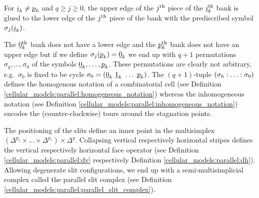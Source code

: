 For $\underline{\smash{i}}_k \neq \underline{\smash{p}}_k$ and $q \ge j \ge 0$,
the upper edge of the $j^{\text{th}}$ piece of the $\underline{\smash{i}}_k^{\text{th}}$ bank is glued to the lower edge of the $j^{\text{th}}$ piece of the bank with the prediscribed symbol $\sigma_j(\underline{\smash{i}}_k)$.

The $\underline{\smash{0}}_k^{\text{th}}$ bank does not have a lower edge and the $\underline{\smash{p}}_k^{\text{th}}$ bank does not have an upper edge but if we define $\sigma_j(\underline{\smash{p}}_k) = \underline{\smash{0}}_k$
we end up with $q+1$ permutations $\sigma_q, \ldots, \sigma_0$ of the symbols $\ul 0_k, \ldots, \ul p_k$.
These permutations are clearly not arbitrary, e.g.\ 
$\sigma_0$ is fixed to be cycle $\sigma_0 = (\ul 0_k\ \ul 1_k\ \ldots\ \ul p_k)$.
The $(q+1)$-tuple $\homog$ defines the homogenous notation of a combinatorial cell (see Definition \ref{cellular_models:parallel:homogeneous_notation})
whereas the inhomogeneous notation (see Definition \ref{cellular_models:parallel:inhomogeneous_notation})
encodes the (counter-clockwise) tours around the stagnation points.

The positioning of the slits define an inner point in the multisimplex $(\Delta^{p_1} \times \ldots \times \Delta^{p_r}) \times \Delta^q$.
Collapsing vertical respectively horizontal stripes defines the vertical respectively horizontal face operator
(see Definition \ref{cellular_models:parallel:dv} respectively Definition \ref{cellular_models:parallel:dh}).
Allowing degenerate slit configurations,
we end up with a semi-multisimplicial complex called the parallel slit complex (see Definition \ref{cellular_models:parallel:parallel_slit_complex}).




